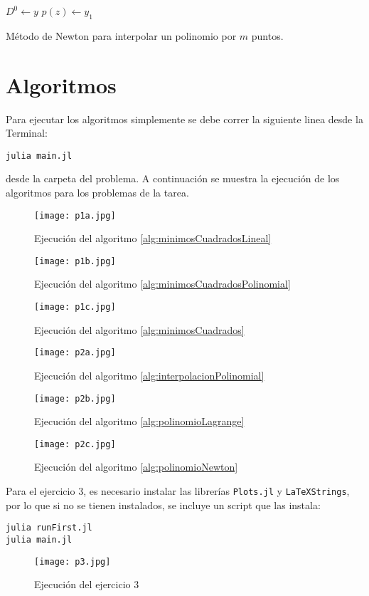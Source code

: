 \begin{algorithm}[H]
	\SetAlgoLined
	$D^0\gets y$\;
	$p(z)\gets y_1$\;
  \caption{Método de Newton para interpolar un polinomio por $m$ puntos.}\label{alg:polinomioNewton}
\end{algorithm}

\section{Algoritmos}
Para ejecutar los algoritmos simplemente se debe correr la siguiente linea desde la Terminal:
\begin{center}
\texttt{julia main.jl}
\end{center}
desde la carpeta del problema. A continuación se muestra la ejecución de los algoritmos para los problemas de la tarea.\\
\begin{figure}[H]
\centering
\texttt{[image: p1a.jpg]}
\caption{Ejecución del algoritmo \ref{alg:minimosCuadradosLineal}}
\end{figure}
\begin{figure}[H]
\centering
\texttt{[image: p1b.jpg]}
\caption{Ejecución del algoritmo \ref{alg:minimosCuadradosPolinomial}}
\end{figure}
\begin{figure}[H]
\centering
\texttt{[image: p1c.jpg]}
\caption{Ejecución del algoritmo \ref{alg:minimosCuadrados}}
\end{figure}
\begin{figure}[H]
\centering
\texttt{[image: p2a.jpg]}
\caption{Ejecución del algoritmo \ref{alg:interpolacionPolinomial}}
\end{figure}
\begin{figure}[H]
\centering
\texttt{[image: p2b.jpg]}
\caption{Ejecución del algoritmo \ref{alg:polinomioLagrange}}
\end{figure}
\begin{figure}[H]
\centering
\texttt{[image: p2c.jpg]}
\caption{Ejecución del algoritmo \ref{alg:polinomioNewton}}
\end{figure}
Para el ejercicio 3, es necesario instalar las librerías \texttt{Plots.jl} y \texttt{LaTeXStrings}, por lo que si no se tienen instalados, se incluye un script que las instala:
\begin{center}
\texttt{julia runFirst.jl}\\
\texttt{julia main.jl}
\end{center}
\begin{figure}[H]
\centering
\texttt{[image: p3.jpg]}
\caption{Ejecución del ejercicio 3}
\end{figure}

